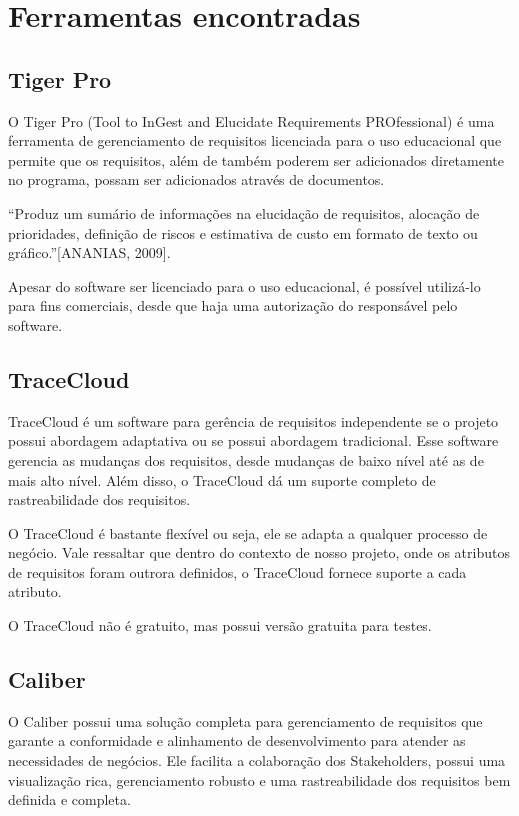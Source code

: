 \section[Ferramentas encontradas]{Ferramentas encontradas}
\subsection{Tiger Pro}
O Tiger Pro (Tool to InGest and Elucidate Requirements PROfessional) é uma ferramenta de gerenciamento de requisitos licenciada para o uso educacional que permite que os requisitos, além de também poderem ser adicionados diretamente no programa, possam ser adicionados através de documentos.

“Produz um sumário de informações na elucidação de requisitos, alocação de prioridades, definição de riscos e estimativa de custo em formato de texto ou gráfico.”[ANANIAS, 2009].

Apesar do software ser licenciado para o uso educacional, é possível utilizá-lo para fins comerciais, desde que haja uma autorização do responsável pelo software.

\subsection{TraceCloud}
TraceCloud é um software para gerência de requisitos independente se o projeto possui abordagem adaptativa ou se possui abordagem tradicional. Esse software gerencia as mudanças dos requisitos, desde mudanças de baixo nível até as de mais alto nível. Além disso, o TraceCloud dá um suporte completo de rastreabilidade dos requisitos.

O TraceCloud é bastante flexível ou seja, ele se adapta a qualquer processo de negócio. Vale ressaltar que dentro do contexto de nosso projeto, onde os atributos de requisitos foram outrora definidos, o TraceCloud fornece suporte a cada atributo.

O TraceCloud não é gratuito, mas possui versão gratuita para testes.

\subsection{Caliber}
O Caliber possui uma solução completa para gerenciamento de requisitos que garante a conformidade e alinhamento de desenvolvimento para atender as necessidades de negócios. Ele facilita a colaboração dos Stakeholders, possui uma visualização rica, gerenciamento robusto e uma rastreabilidade dos requisitos bem definida e completa.

